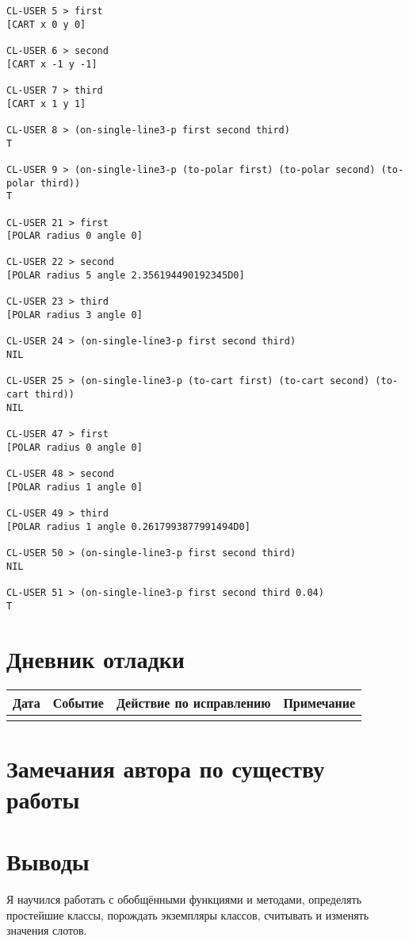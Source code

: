 \documentclass[12pt]{article}
\begin{document}
\begin{verbatim}
CL-USER 5 > first
[CART x 0 y 0]

CL-USER 6 > second
[CART x -1 y -1]

CL-USER 7 > third
[CART x 1 y 1]

CL-USER 8 > (on-single-line3-p first second third)
T

CL-USER 9 > (on-single-line3-p (to-polar first) (to-polar second) (to-polar third))
T

CL-USER 21 > first
[POLAR radius 0 angle 0]

CL-USER 22 > second
[POLAR radius 5 angle 2.356194490192345D0]

CL-USER 23 > third
[POLAR radius 3 angle 0]

CL-USER 24 > (on-single-line3-p first second third)
NIL

CL-USER 25 > (on-single-line3-p (to-cart first) (to-cart second) (to-cart third))
NIL

CL-USER 47 > first
[POLAR radius 0 angle 0]

CL-USER 48 > second
[POLAR radius 1 angle 0]

CL-USER 49 > third
[POLAR radius 1 angle 0.2617993877991494D0]

CL-USER 50 > (on-single-line3-p first second third)
NIL

CL-USER 51 > (on-single-line3-p first second third 0.04)
T
\end{verbatim}

\section{Дневник отладки}
\begin{tabular}{|m{2cm}|m{6cm}|m{4cm}|m{3cm}|}
\hline
Дата & Событие & Действие по исправлению & Примечание \\
\hline
&&&\\
\hline
\end{tabular}

\section{Замечания автора по существу работы}


\section{Выводы}
Я научился работать с обобщёнными функциями и методами, определять простейшие классы, порождать экземпляры классов, считывать и изменять значения слотов.
\end{document}
